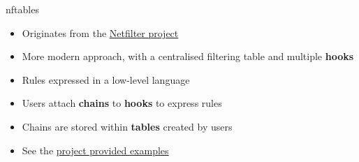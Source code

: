 \begin{frame}{nftables}
	\begin{itemize}
		\item Originates from the \href{https://www.netfilter.org/}{Netfilter project}
		\item More modern approach, with a centralised filtering table and multiple \textbf{hooks}
		\item Rules expressed in a low-level language
		\item Users attach \textbf{chains} to \textbf{hooks} to express rules
		\item Chains are stored within \textbf{tables} created by users
		\item See the \href{https://wiki.nftables.org/wiki-nftables/index.php/Simple_ruleset_for_a_server}{project provided examples}
	\end{itemize}
\end{frame}

